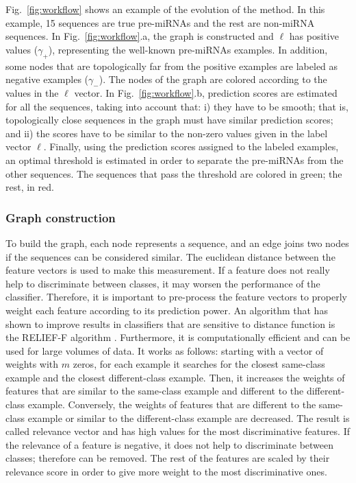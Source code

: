\documentclass{article}
\newcommand*\Bell{\ensuremath{\boldsymbol\ell}}
\begin{document}
Fig.~\ref{fig:workflow} shows an example of the evolution of the method. In this example, 15 sequences are true pre-miRNAs and the rest are non-miRNA sequences. In Fig.~\ref{fig:workflow}.a, the graph is constructed and $\Bell$ has positive values ($\gamma_{+}$), representing the well-known pre-miRNAs examples. In addition, some nodes that are topologically far from the positive examples are labeled as negative examples ($\gamma_{-}$). The nodes of the graph are colored according to the values in the $\Bell$ vector. In  Fig.~\ref{fig:workflow}.b, prediction scores are estimated for all the sequences, taking into account that: i) they have to be smooth; that is, topologically close sequences in the graph must have similar prediction scores; and ii) the scores have to be similar to the non-zero values given in the label vector $\Bell$. Finally, using the prediction scores assigned to the labeled examples, an optimal threshold is estimated in order to separate the pre-miRNAs from the other sequences. The sequences that pass the threshold are colored in green; the rest, in red.

\subsubsection{Graph construction}
To build the graph, each node represents a sequence, and an edge joins two nodes if the sequences can be considered similar. The euclidean distance between the feature vectors is used to make this measurement. If a feature does not really help to discriminate between classes, it may worsen the performance of the classifier. Therefore, it is important to pre-process the feature vectors to properly weight each feature according to its prediction power. An algorithm that has shown to improve results in classifiers that are sensitive to distance function is the RELIEF-F algorithm \citep{kononenko1994estimating, wettschereck1997review}. Furthermore, it is computationally efficient and can be used for large volumes of data.
It  works as follows: starting with a vector of weights with $m$ zeros, for each example it searches for the closest same-class example and the closest different-class example. Then, it increases the weights of features that are similar to the same-class example and different to the different-class example. Conversely, the weights of features that are different to the same-class example or similar to the different-class example are decreased. The result is called relevance vector and has high values for the most discriminative features. If the relevance of a feature is negative, it does not help to discriminate between classes; therefore can be removed. The rest of the features are scaled by their relevance score in order to give more weight to the most discriminative ones.
\end{document}

